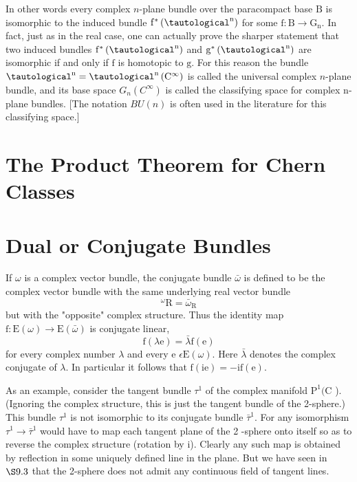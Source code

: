 \documentclass[10pt]{article}
\begin{document}
In other words every complex $n$-plane bundle over the paracompact base $\mathrm{B}$ is isomorphic to the induced bundle $\mathrm{f}^{*}\left(\tautological^{\mathrm{n}}\right)$ for some $\mathrm{f}: \mathrm{B} \rightarrow \mathrm{G}_{\mathrm{n}}$. In fact, just as in the real case, one can actually prove the sharper statement that two induced bundles $\mathrm{f}^{*}\left(\tautological^{\mathrm{n}}\right)$ and $\mathrm{g}^{*}\left(\tautological^{\mathrm{n}}\right)$ are isomorphic if and only if $\mathrm{f}$ is homotopic to $\mathrm{g}$. For this reason the bundle $\tautological^{\mathrm{n}}=\tautological^{\mathrm{n}}\left(\mathrm{C}^{\infty}\right)$ is called the universal complex $n$-plane bundle, and its base space $G_{n}\left(C^{\infty}\right)$ is called the classifying space for complex $\mathrm{n}$-plane bundles. [The notation $B U(n)$ is often used in the literature for this classifying space.]

\section{The Product Theorem for Chern Classes}


\section{Dual or Conjugate Bundles}
If $\omega$ is a complex vector bundle, the conjugate bundle $\bar{\omega}$ is defined to be the complex vector bundle with the same underlying real vector bundle
$$
{ }^{\omega} \mathrm{R}=\bar{\omega}_{\mathrm{R}}
$$
but with the "opposite" complex structure. Thus the identity map $\mathrm{f}: \mathrm{E}(\omega) \rightarrow \mathrm{E}(\bar{\omega})$ is conjugate linear,
$$
\mathrm{f}(\lambda \mathrm{e})=\bar{\lambda} \mathrm{f}(\mathrm{e})
$$
for every complex number $\lambda$ and every e $\epsilon \mathrm{E}(\omega)$. Here $\bar{\lambda}$ denotes the complex conjugate of $\lambda$. In particular it follows that $\mathrm{f}(\mathrm{ie})=-\mathrm{if}(\mathrm{e})$.

As an example, consider the tangent bundle $\tau^{1}$ of the complex manifold $\mathrm{P}^{1}(\mathrm{C}$ ). (Ignoring the complex structure, this is just the tangent bundle of the 2-sphere.) This bundle $\tau^{1}$ is not isomorphic to its conjugate bundle $\bar{\tau}^{1}$. For any isomorphism $\tau^{1} \rightarrow \bar{\tau}^{1}$ would have to map each tangent plane of the 2 -sphere onto itself so as to reverse the complex structure (rotation by i). Clearly any such map is obtained by reflection in some uniquely defined line in the plane. But we have seen in $\S 9.3$ that the 2-sphere does not admit any continuous field of tangent lines.
\end{document}
